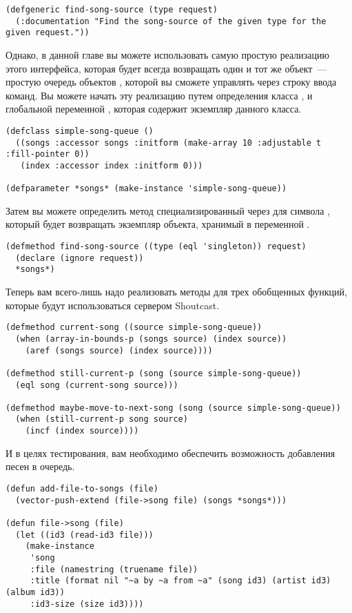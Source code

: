 \begin{lstlisting}
(defgeneric find-song-source (type request)
  (:documentation "Find the song-source of the given type for the given request."))
\end{lstlisting}

Однако, в данной главе вы можете использовать самую простую реализацию этого интерфейса,
которая будет всегда возвращать один и тот же объект~--- простую очередь объектов
, которой вы сможете управлять через строку ввода команд. Вы можете начать эту
реализацию путем определения класса , и глобальной переменной
, которая содержит экземпляр данного класса.

\begin{lstlisting}
(defclass simple-song-queue ()
  ((songs :accessor songs :initform (make-array 10 :adjustable t :fill-pointer 0))
   (index :accessor index :initform 0)))

(defparameter *songs* (make-instance 'simple-song-queue))
\end{lstlisting}

Затем вы можете определить метод  специализированный через
 для символа , который будет возвращать экземпляр объекта,
хранимый в переменной .

\begin{lstlisting}
(defmethod find-song-source ((type (eql 'singleton)) request)
  (declare (ignore request))
  *songs*)
\end{lstlisting}

Теперь вам всего-лишь надо реализовать методы для трех обобщенных функций, которые будут
использоваться сервером Shoutcast.

\begin{lstlisting}
(defmethod current-song ((source simple-song-queue))
  (when (array-in-bounds-p (songs source) (index source))
    (aref (songs source) (index source))))

(defmethod still-current-p (song (source simple-song-queue))
  (eql song (current-song source)))

(defmethod maybe-move-to-next-song (song (source simple-song-queue))
  (when (still-current-p song source)
    (incf (index source))))
\end{lstlisting}

И в целях тестирования, вам необходимо обеспечить возможность добавления песен в очередь.

\begin{lstlisting}
(defun add-file-to-songs (file)
  (vector-push-extend (file->song file) (songs *songs*)))

(defun file->song (file)
  (let ((id3 (read-id3 file)))
    (make-instance 
     'song
     :file (namestring (truename file))
     :title (format nil "~a by ~a from ~a" (song id3) (artist id3) (album id3))
     :id3-size (size id3))))
\end{lstlisting}

